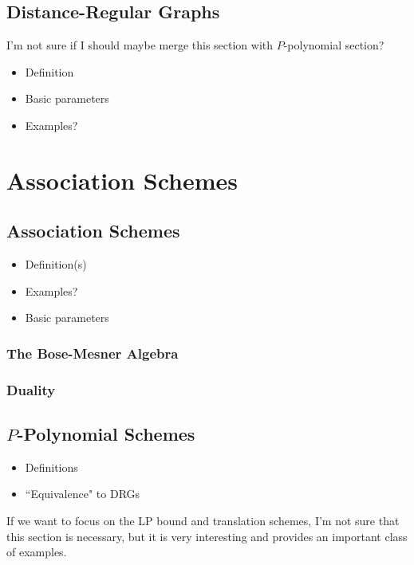 \documentclass{report}
\begin{document}
  \section{Distance-Regular Graphs}
    I'm not sure if I should maybe merge this section with $P$-polynomial
    section?

    \begin{itemize}
      \item Definition
      \item Basic parameters
      \item Examples?
    \end{itemize}

\chapter{Association Schemes}
  \section{Association Schemes}
    \begin{itemize}
      \item Definition(s)
      \item Examples?
      \item Basic parameters
    \end{itemize}

    \subsection{The Bose-Mesner Algebra}

    \subsection{Duality}

  \section{$P$-Polynomial Schemes}
    \begin{itemize}
      \item Definitions
      \item ``Equivalence" to DRGs
    \end{itemize}

    If we want to focus on the LP bound and translation schemes, I'm not sure
    that this section is necessary, but it is very interesting and provides an
    important class of examples.
\end{document}
